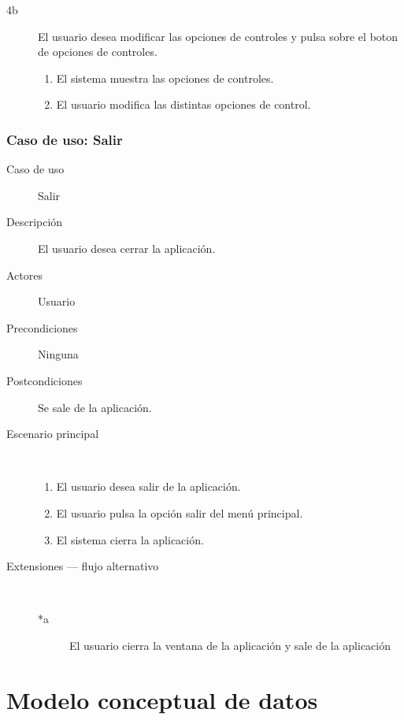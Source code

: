 \begin{description}
\begin{description}
            \item [4b ] El usuario desea modificar las opciones de controles y pulsa sobre el boton de opciones de controles.
                \begin{enumerate}
                    \item El sistema muestra las opciones de controles.
                    \item El usuario modifica las distintas opciones de control.
                \end{enumerate}
            
        \end{description}
\end{description}

\subsubsection{Caso de uso: Salir}

\begin{description}
    \item[Caso de uso] Salir
    \item[Descripción] El usuario desea cerrar la aplicación.
    \item[Actores] Usuario
    \item[Precondiciones] Ninguna
    \item[Postcondiciones] Se sale de la aplicación.
    \item[Escenario principal] $\quad$
        \begin{enumerate}
            \item El usuario desea salir de la aplicación.
            \item El usuario pulsa la opción salir del menú principal.
            \item El sistema cierra la aplicación.
        \end{enumerate}
    \item[Extensiones --- flujo alternativo] $\quad$
        \begin{description}
            \item[*a ] El usuario cierra la ventana de la aplicación y sale de la aplicación
        \end{description}
\end{description}

\section{Modelo conceptual de datos}

